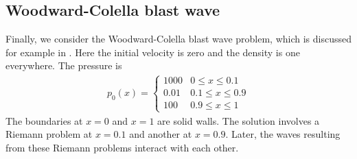 \documentclass{SIAMbook2016}
\begin{document}
\hypertarget{woodward-colella-blast-wave}{%
\subsection{Woodward-Colella blast
wave}\label{woodward-colella-blast-wave}}

Finally, we consider the Woodward-Colella blast wave problem, which is
discussed for example in \cite{fvmhp}. Here the initial velocity is zero
and the density is one everywhere. The pressure is \begin{align}
    p_0(x) = \begin{cases} 1000 & 0 \le x \le 0.1 \\
                           0.01 & 0.1 \le x \le 0.9 \\
                           100  & 0.9 \le x \le 1
    \end{cases}
\end{align} The boundaries at \(x=0\) and \(x=1\) are solid walls. The
solution involves a Riemann problem at \(x=0.1\) and another at
\(x=0.9\). Later, the waves resulting from these Riemann problems
interact with each other.
\end{document}
